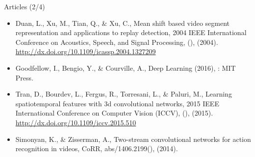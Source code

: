 \documentclass[presentation]{beamer}
\begin{document}
\begin{frame}[label={sec:org98ec917}]{Articles (2/4)}
\begin{itemize}
\item Duan, L., Xu, M., Tian, Q., \& Xu, C., Mean shift based video segment representation and applications to replay detection, 2004 IEEE International Conference on Acoustics, Speech, and Signal Processing, (),  (2004).  \url{http://dx.doi.org/10.1109/icassp.2004.1327209}
\item Goodfellow, I., Bengio, Y., \& Courville, A., Deep Learning (2016), : MIT Press.
\item Tran, D., Bourdev, L., Fergus, R., Torresani, L., \& Paluri, M., Learning spatiotemporal features with 3d convolutional networks, 2015 IEEE International Conference on Computer Vision (ICCV), (),  (2015).  \url{http://dx.doi.org/10.1109/iccv.2015.510}
\item Simonyan, K., \& Zisserman, A., Two-stream convolutional networks for action recognition in videos, CoRR, abs/1406.2199(),  (2014).
\end{itemize}
\end{frame}
\end{document}
